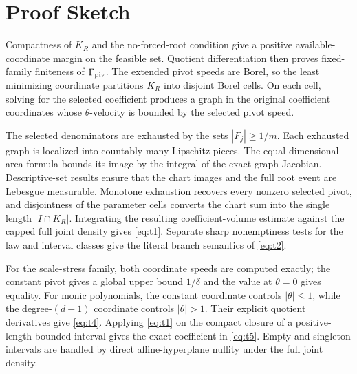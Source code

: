 \section{Proof Sketch}

Compactness of $K_R$ and the no-forced-root condition give a positive
available-coordinate margin on the feasible set.  Quotient differentiation
then proves fixed-family finiteness of $\Gamma_{\rm piv}$.  The extended
pivot speeds are Borel, so the least minimizing coordinate partitions $K_R$
into disjoint Borel cells.  On each cell, solving for the selected coefficient
produces a graph in the original coefficient coordinates whose
$\theta$-velocity is bounded by the selected pivot speed.

The selected denominators are exhausted by the sets
$|F_j|\geq1/m$.  Each exhausted graph is localized into countably many
Lipschitz pieces.  The equal-dimensional area formula bounds its image by
the integral of the exact graph Jacobian.  Descriptive-set results ensure
that the chart images and the full root event are Lebesgue measurable.
Monotone exhaustion recovers every nonzero selected pivot, and disjointness
of the parameter cells converts the chart sum into the single length
$|I\cap K_R|$.  Integrating the resulting coefficient-volume estimate
against the capped full joint density gives \eqref{eq:t1}.  Separate sharp
nonemptiness tests for the law and interval classes give the literal branch
semantics of \eqref{eq:t2}.

For the scale-stress family, both coordinate speeds are computed exactly;
the constant pivot gives a global upper bound $1/\delta$ and the value at
$\theta=0$ gives equality.  For monic polynomials, the constant coordinate
controls $|\theta|\leq1$, while the degree-$(d-1)$ coordinate controls
$|\theta|>1$.  Their explicit quotient derivatives give \eqref{eq:t4}.
Applying \eqref{eq:t1} on the compact closure of a positive-length bounded
interval gives the exact coefficient in \eqref{eq:t5}.  Empty and singleton
intervals are handled by direct affine-hyperplane nullity under the full
joint density.
